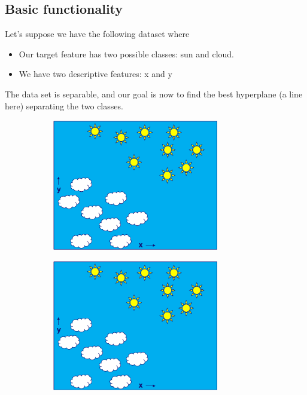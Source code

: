 \subsection{Basic functionality}

\begin{note}
Let's suppose we have the following dataset where 
\begin{itemize}
  \item Our target feature has two possible classes: sun and cloud. 
  \item We have two descriptive features: x and y
\end{itemize}

The data set is separable, and our goal is now to find the best hyperplane (a line here) separating the two classes.

\begin{figure}[H]
  \centering
  \begin{subfigure}{0.3\textwidth}
    \centering
    \includegraphics[width=0.8\textwidth]{assets/svm/b__original_set.png}
  \end{subfigure}\hspace*{0.05\textwidth}
  \begin{subfigure}{0.3\textwidth}
    \centering
    \includegraphics[width=0.8\textwidth]{assets/svm/b__original_set.png}

\end{subfigure}
\end{figure}
\end{note}
